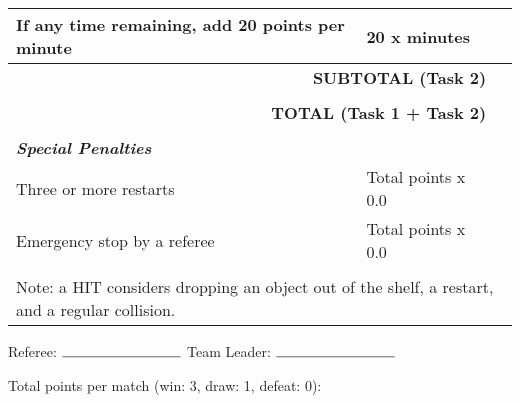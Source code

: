\documentclass{article}
\begin{document}
\begin{center}
\begin{tabular}{ |m{8cm}|m{3cm}|m{1cm}| }
    If any time remaining, add 20 points per minute & 20 x minutes & \\ 
    \hline
    \multicolumn{2}{|r|}{\textbf{SUBTOTAL (Task 2)}  } &\\
    \hline
    \multicolumn{3}{|l|}{}\\
    \hline
    \multicolumn{2}{|r|}{\textbf{TOTAL (Task 1 + Task 2)}  } &\\
    \hline
    \multicolumn{3}{|l|}{}\\
    \hline
    \multicolumn{3}{|l|}{\textbf{\textit{Special Penalties}}} \\ 
    \hline
    Three or more restarts & Total points x 0.0 & \\
    \hline
    Emergency stop by a referee & Total points x 0.0 & \\
    \hline
    \multicolumn{3}{|l|}{}\\
    \hline
    \multicolumn{3}{|l|}{Note: a HIT considers dropping an object out of the shelf, a restart, and a regular collision.} \\ 
    \hline
\end{tabular}
\end{center}

\begin{center} Referee: $\rule{3cm}{0.15mm}$ Team Leader: $\rule{3cm}{0.15mm}$ \end{center}

\newpage

Total points per match (win: 3, draw: 1, defeat: 0):
\end{document}
